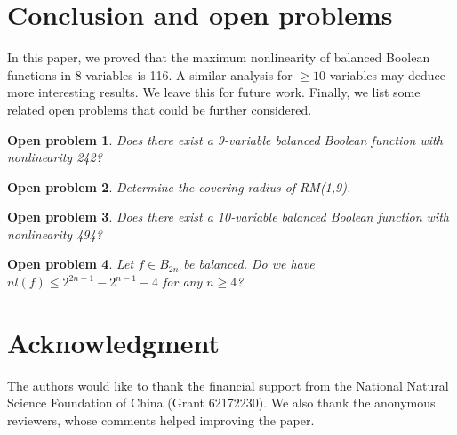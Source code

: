 \documentclass[11pt]{article}
\newtheorem{open problem}{Open problem}
\begin{document}
\section{Conclusion and open problems}
In this paper, we proved that the maximum nonlinearity of balanced Boolean functions in 8 variables is 116. A similar analysis for $\ge 10$ variables may deduce more interesting results. We leave this for future work. Finally, we list some related open problems that could be further considered.

\begin{open problem} Does there exist a 9-variable balanced Boolean function with nonlinearity 242?
\end{open problem}

\begin{open problem} Determine the covering radius of RM(1,9).
\end{open problem}

\begin{open problem} Does there exist a 10-variable balanced Boolean function with nonlinearity 494?
\end{open problem}

\begin{open problem} Let $f\in B_{2n}$ be balanced. Do we have $nl(f)\le 2^{2n-1}-2^{n-1}-4$ for any $n\ge 4$?
\end{open problem}

\section*{Acknowledgment}

The authors would like to thank the financial support from the National Natural Science Foundation of China (Grant 62172230). We also thank the anonymous reviewers, whose comments helped improving the paper.
\end{document}
